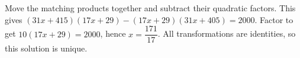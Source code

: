 Move the matching products together and subtract their quadratic factors. This gives $(31x+415)(17x+29)-(17x+29)(31x+405)=2000$. Factor to get $10(17x+29)=2000$, hence $\boxed{x=\dfrac{171}{17}}$. All transformations are identities, so this solution is unique.
